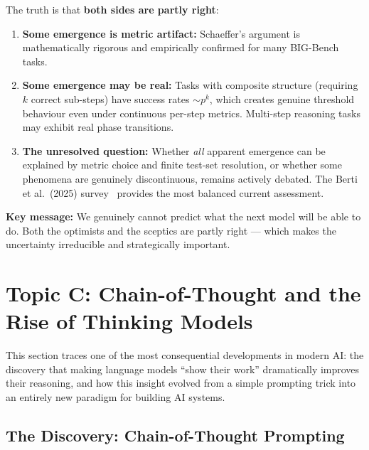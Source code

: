 \documentclass[11pt, a4paper]{article}
\theoremstyle{definition}
\theoremstyle{plain}
\begin{document}
The truth is that \textbf{both sides are partly right}:

\begin{enumerate}
  \item \textbf{Some emergence is metric artifact:} Schaeffer's argument is mathematically rigorous and empirically confirmed for many BIG-Bench tasks.
  \item \textbf{Some emergence may be real:} Tasks with composite structure (requiring $k$ correct sub-steps) have success rates ${\sim}p^k$, which creates genuine threshold behaviour even under continuous per-step metrics. Multi-step reasoning tasks may exhibit real phase transitions.
  \item \textbf{The unresolved question:} Whether \emph{all} apparent emergence can be explained by metric choice and finite test-set resolution, or whether some phenomena are genuinely discontinuous, remains actively debated. The Berti et al.\ (2025) survey~\cite{berti2025survey} provides the most balanced current assessment.
\end{enumerate}

\textbf{Key message:} We genuinely cannot predict what the next model will be able to do. Both the optimists and the sceptics are partly right --- which makes the uncertainty irreducible and strategically important.


\section{Topic C: Chain-of-Thought and the Rise of Thinking Models}
\label{sec:cot}

This section traces one of the most consequential developments in modern AI: the discovery that making language models ``show their work'' dramatically improves their reasoning, and how this insight evolved from a simple prompting trick into an entirely new paradigm for building AI systems.

\subsection{The Discovery: Chain-of-Thought Prompting}
\label{subsec:cot-discovery}
\end{document}
